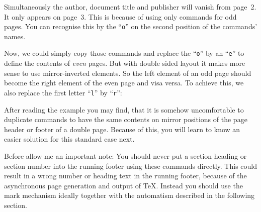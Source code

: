 \begin{Example}
  Simultaneously the author, document title and publisher will vanish from
  page~2. It only appears on page~3. This is because of using only commands
  for odd pages. You can recognise this by the ``\texttt{o}'' on the second
  position of the commands' names.

  Now, we could simply copy those commands and replace the ``\texttt{o}'' by
  an ``\texttt{e}'' to define the contents of \emph{even} pages. But with
  double sided layout it makes more sense to use mirror-inverted elements. So
  the left element of an odd page should become the right element of the even
  page and visa versa. To achieve this, we also replace the first letter
  ``\texttt{l}'' by ``\texttt{r}'':
\end{Example}
%
After reading the example you may find, that it is somehow uncomfortable to
duplicate commands to have the same contents on mirror positions of the page
header or footer of a double page. Because of this, you will learn to know an
easier solution for this standard case next.

Before allow me an important note: You should never put a
section heading or section number into the running footer using these commands
directly. This could result in a wrong number or heading text in the running
footer, because of the asynchronous page generation and output of \TeX. Instead
you should use the mark mechanism ideally together with the automatism
described in the following section.%
%
%
%
%
%
%

